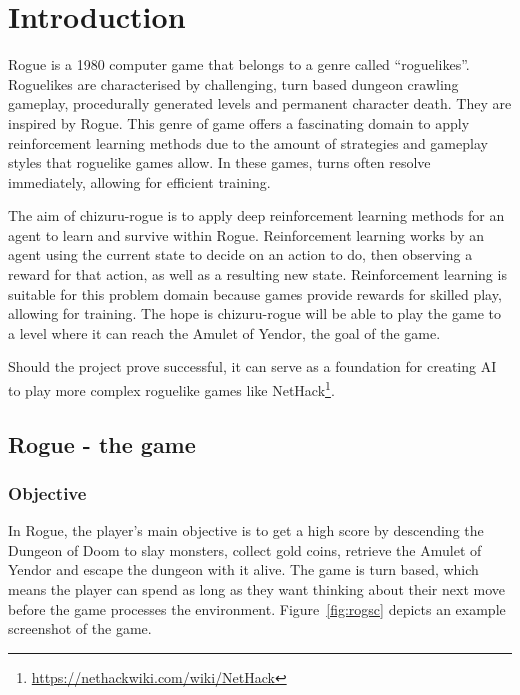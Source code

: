\documentclass[12pt,a4paper]{article}
\begin{document}
    \newpage

    \tableofcontents
    \listoffigures

    \newpage


    \section{Introduction}\label{sec:introduction}
    Rogue is a 1980 computer game that belongs to a genre called ``roguelikes''.
    Roguelikes are characterised by challenging, turn based dungeon crawling gameplay, procedurally generated levels and permanent character death.
    They are inspired by Rogue.
    This genre of game offers a fascinating domain to apply reinforcement learning methods due to the amount of strategies and gameplay styles that roguelike games allow.
    In these games, turns often resolve immediately, allowing for efficient training.

    The aim of chizuru-rogue is to apply deep reinforcement learning methods for an agent to learn and survive within Rogue.
    Reinforcement learning works by an agent using the current state to decide on an action to do, then observing a reward for that action, as well as a resulting new state.
    Reinforcement learning is suitable for this problem domain because games provide rewards for skilled play, allowing for training.
    The hope is chizuru-rogue will be able to play the game to a level where it can reach the Amulet of Yendor, the goal of the game.

    Should the project prove successful, it can serve as a foundation for creating AI to play more complex
    roguelike games like NetHack\footnote{\url{https://nethackwiki.com/wiki/NetHack}}.

    \subsection{Rogue - the game}\label{subsec:rogue}
    \subsubsection{Objective}\label{subsubsec:objective}
    In Rogue, the player's main objective is to get a high score by descending the Dungeon of Doom to slay monsters, collect gold coins, retrieve the Amulet of Yendor and escape the dungeon with it alive.
    The game is turn based, which means the player can spend as long as they want thinking about their next move before the game processes the environment.
    Figure~\ref{fig:rogsc} depicts an example screenshot of the game.
\end{document}
